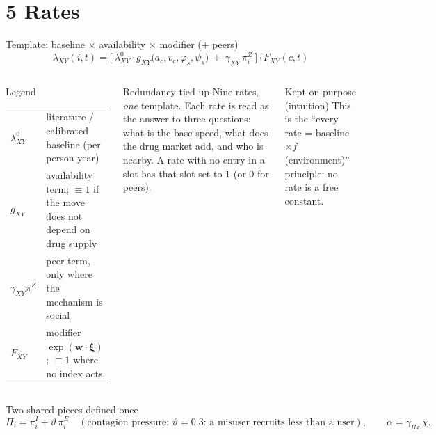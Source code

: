 ﻿\documentclass[9pt,aspectratio=169]{beamer}
\newenvironment{tied}{\begin{alertblock}{Redundancy tied up}\small}{\end{alertblock}}
\newenvironment{kept}{\begin{exampleblock}{Kept on purpose (intuition)}\small}{\end{exampleblock}}
\newenvironment{legend}{\begin{block}{Legend}\scriptsize}{\end{block}}
\begin{document}
\section{5 Rates}
\begin{frame}{Template: baseline $\times$ availability $\times$ modifier (+ peers)}
 \[
  \boxed{\ \lambda_{XY}(i,t)=\Big[\ \lambda^0_{XY}\cdot g_{XY}\big(a_c,v_c,\varphi_s,\psi_s\big)\ +\ \gamma_{XY}\,\pi^{Z}_i\ \Big]\cdot F_{XY}(c,t)\ }
 \]
 \begin{columns}[T]
 \begin{legend}
 \begin{tabular}{@{}p{1.2cm}p{5.8cm}@{}}
 $\lambda^0_{XY}$ & literature / calibrated baseline (per person-year)\\
 $g_{XY}$ & availability term; $\equiv1$ if the move does not depend on drug supply\\
 $\gamma_{XY}\pi^Z$ & peer term, only where the mechanism is social\\
 $F_{XY}$ & modifier $\exp(\bm w\cdot\bm\xi)$; $\equiv1$ where no index acts
 \end{tabular}
 \end{legend}
 \begin{tied}
  Nine rates, \emph{one} template. Each rate is read as the answer to three questions: what is the base speed, what does the drug market add, and who is nearby. A rate with no entry in a slot has that slot set to $1$ (or $0$ for peers).
 \end{tied}
 \begin{kept}
  This is the ``every rate = baseline $\times f$(environment)'' principle: no rate is a free constant.
 \end{kept}
 \end{columns}
 \vspace{2pt}
 \begin{block}{Two shared pieces defined once}\scriptsize
 \[
  \Pi_i=\pi^I_i+\vartheta\,\pi^E_i\quad(\text{contagion pressure; $\vartheta=0.3$: a misuser recruits less than a user}),\qquad
  \alpha=\gamma_{Rx}\,\chi .
 \]
 \end{block}
\end{frame}
\end{document}
